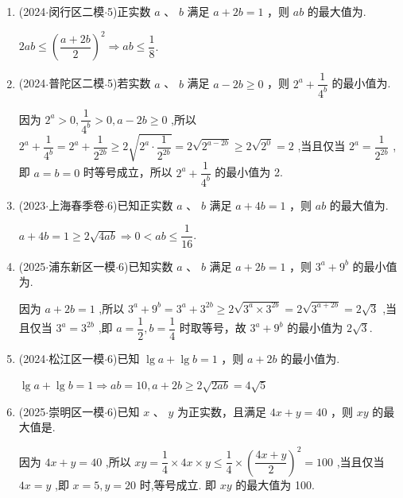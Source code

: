 \begin{enumerate}
    \item (2024$\cdot$闵行区二模$\cdot$5)正实数 $a$ 、 $b$ 满足 $a + {2b} = 1$ ，则 ${ab}$ 的最大值为.
    \begin{jieda}
        ${2ab} \leq  {\left( \dfrac{a + {2b}}{2}\right) }^{2} \Longrightarrow  {ab} \leq  \dfrac{1}{8}$.
    \end{jieda}

    \item (2024$\cdot$普陀区二模$\cdot$5)若实数 $a$ 、 $b$ 满足 $a - {2b} \geq  0$ ，则 ${2}^{a} + \dfrac{1}{{4}^{b}}$ 的最小值为.
    \begin{jieda}
        因为 ${2}^{a} > 0,\dfrac{1}{{4}^{b}} > 0,a - {2b} \geq  0$ ,所以 ${2}^{a} + \dfrac{1}{{4}^{b}} = {2}^{a} +  \dfrac{1}{{2}^{2b}} \geq  2\sqrt{{2}^{a} \cdot  \dfrac{1}{{2}^{2b}}} = 2\sqrt{{2}^{a - {2b}}} \geq  2\sqrt{{2}^{0}} = 2$ ,当且仅当 ${2}^{a} = \dfrac{1}{{2}^{2b}}$ , 即 $a = b = 0$ 时等号成立，所以 ${2}^{a} + \dfrac{1}{{4}^{b}}$ 的最小值为 2.
    \end{jieda}

    \item (2023$\cdot$上海春季卷$\cdot$6)已知正实数 $a$ 、 $b$ 满足 $a + {4b} = 1$ ，则 ${ab}$ 的最大值为.
    \begin{jieda}
        $a + {4b} = 1 \geq  2\sqrt{4ab} \Longrightarrow  0 < {ab} \leq  \dfrac{1}{16}$.
    \end{jieda}

    \item (2025$\cdot$浦东新区一模$\cdot$6)已知实数 $a$ 、 $b$ 满足 $a + {2b} = 1$ ，则 ${3}^{a} + {9}^{b}$ 的最小值为.
    \begin{jieda}
        因为 $a + {2b} = 1$ ,所以 ${3}^{a} + {9}^{b} = {3}^{a} + {3}^{2b} \geq  2\sqrt{{3}^{a} \times  {3}^{2b}} =  2\sqrt{{3}^{a + {2b}}} = 2\sqrt{3}$ ,当且仅当 ${3}^{a} = {3}^{2b}$ ,即 $a = \dfrac{1}{2},b = \dfrac{1}{4}$ 时取等号，故 ${3}^{a} + {9}^{b}$ 的最小值为 $2\sqrt{3}$.
    \end{jieda}

    \item (2024$\cdot$松江区一模$\cdot$6)已知 $\lg a + \lg b = 1$ ，则 $a + {2b}$ 的最小值为.
    \begin{jieda}
        $\lg a + \lg b = 1 \Longrightarrow  {ab} = {10},a + {2b} \geq  2\sqrt{2ab} = 4\sqrt{5}$
    \end{jieda}

    \item (2025$\cdot$崇明区一模$\cdot$6)已知 $x$ 、 $y$ 为正实数，且满足 ${4x} + y = {40}$ ，则 ${xy}$ 的最大值是.
    \begin{jieda}
        因为 ${4x} + y = {40}$ ,所以 ${xy} = \dfrac{1}{4} \times  {4x} \times  y \leq  \dfrac{1}{4} \times  {\left( \dfrac{{4x} + y}{2}\right) }^{2} = {100}$ ,当且仅当 ${4x} = y$ ,即 $x = 5,y = {20}$ 时,等号成立. 即 ${xy}$ 的最大值为 100.
    \end{jieda}


\end{enumerate}
